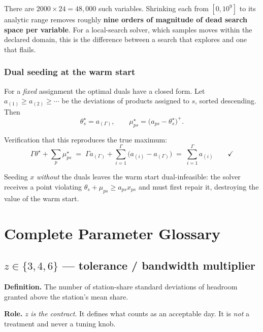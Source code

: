 \documentclass[11pt,a4paper]{article}
\begin{document}
There are $2000\times24 = 48{,}000$ such variables. Shrinking each from
$[0,10^9]$ to its analytic range removes roughly \textbf{nine orders of
magnitude of dead search space per variable}. For a local-search solver, which
samples moves within the declared domain, this is the difference between a
search that explores and one that flails.

\subsubsection*{Dual seeding at the warm start}

For a \emph{fixed} assignment the optimal duals have a closed form. Let
$a_{(1)}\ge a_{(2)}\ge\cdots$ be the deviations of products assigned to $s$,
sorted descending. Then
\begin{equation}
  \theta_s^\star = a_{(\Gamma)},
  \qquad
  \mu_{ps}^\star = \bigl(a_{ps}-\theta_s^\star\bigr)^{+} .
  \label{eq:dualseed}
\end{equation}

Verification that this reproduces the true maximum:
\[
  \Gamma\theta^\star + \sum_p \mu^\star_{ps}
  \;=\;
  \Gamma a_{(\Gamma)} + \sum_{i=1}^{\Gamma}\bigl(a_{(i)}-a_{(\Gamma)}\bigr)
  \;=\;
  \sum_{i=1}^{\Gamma} a_{(i)} \qquad\checkmark
\]

Seeding $x$ \emph{without} the duals leaves the warm start dual-infeasible: the
solver receives a point violating $\theta_s+\mu_{ps}\ge a_{ps}x_{ps}$ and must
first repair it, destroying the value of the warm start.

\section{Complete Parameter Glossary}

\subsection{\texorpdfstring{$z\in\{3,4,6\}$}{z in {3,4,6}} --- tolerance / bandwidth multiplier}

\textbf{Definition.} The number of station-share standard deviations of
headroom granted above the station's mean share.

\textbf{Role.} $z$ \emph{is the contract}. It defines what counts as an
acceptable day. It is \emph{not} a treatment and never a tuning knob.
\end{document}
